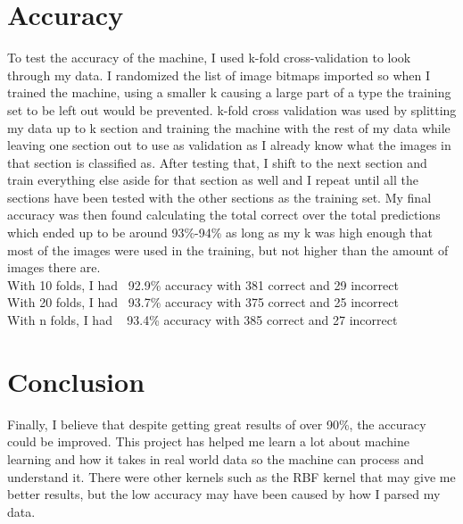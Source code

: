\documentclass{article}
\begin{document}
\section{Accuracy}
To test the accuracy of the machine, I used k-fold cross-validation to look through my data. I randomized the list of image bitmaps imported so when I trained the machine, using a smaller k causing a large part of a type the training set to be left out would be prevented. k-fold cross validation was used by splitting my data up to k section and training the machine with the rest of my data while leaving one section out to use as validation as I already know what the images in that section is classified as. After testing that, I shift to the next section and train everything else aside for that section as well and I repeat until all the sections have been tested with the other sections as the training set. My final accuracy was then found calculating the total correct over the total predictions which ended up to be around 93\%-94\% as long as my k was high enough that most of the images were used in the training, but not higher than the amount of images there are.
\newline
\\With 10 folds, I had ~92.9\% accuracy with 381 correct and 29 incorrect
\\With 20 folds, I had ~93.7\% accuracy with 375 correct and 25 incorrect
\\With n folds, I had ~ 93.4\% accuracy with 385 correct and 27 incorrect

\section{Conclusion}
Finally, I believe that despite getting great results of over 90\%, the accuracy could be improved. This project has helped me learn a lot about machine learning and how it takes in real world data so the machine can process and understand it. There were other kernels such as the RBF kernel that may give me better results, but the low accuracy may have been caused by how I parsed my data. 
\end{document}
